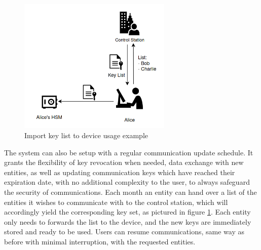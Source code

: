 \begin{figure}[h]
    \centering
    \includegraphics[width=0.65\textwidth]{./Images/arch-import-service.png}
    \caption{Import key list to device usage example}
    \label{fig:arch:import-service}
\end{figure}

The system can also be setup with a regular communication update schedule. It grants the flexibility of key revocation when needed, data exchange with new entities, as well as updating communication keys which have reached their expiration date, with no additional complexity to the user, to always safeguard the security of communications.
Each month an entity can hand over a list of the entities it wishes to communicate with to the control station, which will accordingly yield the corresponding key set, as pictured in figure \ref{fig:arch:import-service}.
Each entity only needs to forwards the list to the device, and the new keys are immediately stored and ready to be used.
Users can resume communications, same way as before with minimal interruption, with the requested entities.



